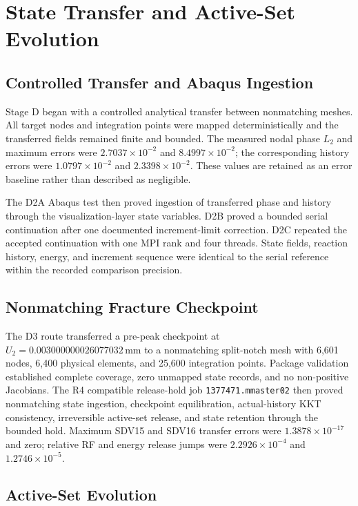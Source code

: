 \chapter{State Transfer and Active-Set Evolution}
\label{chap:stage-d-synthesis}

\section{Controlled Transfer and Abaqus Ingestion}

Stage D began with a controlled analytical transfer between nonmatching meshes.
All target nodes and integration points were mapped deterministically and the
transferred fields remained finite and bounded.  The measured nodal phase
\(L_2\) and maximum errors were \(2.7037\times10^{-2}\) and
\(8.4997\times10^{-2}\); the corresponding history errors were
\(1.0797\times10^{-2}\) and \(2.3398\times10^{-2}\).  These values are retained
as an error baseline rather than described as negligible.

The D2A Abaqus test then proved ingestion of transferred phase and history
through the visualization-layer state variables.  D2B proved a bounded serial
continuation after one documented increment-limit correction.  D2C repeated
the accepted continuation with one MPI rank and four threads.  State fields,
reaction history, energy, and increment sequence were identical to the serial
reference within the recorded comparison precision.

\section{Nonmatching Fracture Checkpoint}

The D3 route transferred a pre-peak checkpoint at
\(U_2=0.003000000026077032\,\mathrm{mm}\) to a nonmatching split-notch mesh
with 6,601 nodes, 6,400 physical elements, and 25,600 integration points.
Package validation established complete coverage, zero unmapped state records,
and no non-positive Jacobians.  The R4 compatible release-hold job
\texttt{1377471.mmaster02} then proved nonmatching state ingestion,
checkpoint equilibration, actual-history KKT consistency, irreversible
active-set release, and state retention through the bounded hold.  Maximum
SDV15 and SDV16 transfer errors were \(1.3878\times10^{-17}\) and zero;
relative RF and energy release jumps were \(2.2926\times10^{-4}\) and
\(1.2746\times10^{-5}\).

\section{Active-Set Evolution}

